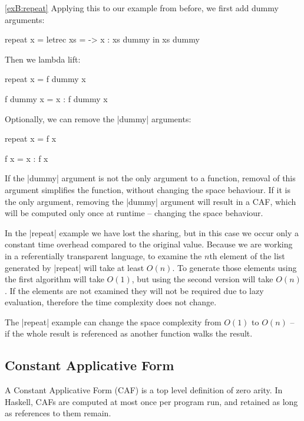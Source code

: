 \begin{examplerevisit}{\ref{exB:repeat}}
Applying this to our example from before, we first add dummy arguments:

\ignore\begin{code}
repeat x =  letrec xs = \dummy ->  x : xs dummy
            in xs dummy
\end{code}

Then we lambda lift:

\begin{onepage}
\begin{code}
repeat x = f dummy x

f dummy x = x : f dummy x
\end{code}
\end{onepage}

Optionally, we can remove the |dummy| arguments:

\begin{code}
repeat x = f x

f x = x : f x
\end{code}
\end{examplerevisit}

If the |dummy| argument is not the only argument to a function, removal of this argument simplifies the function, without changing the space behaviour. If it is the only argument, removing the |dummy| argument will result in a CAF, which will be computed only once at runtime -- changing the space behaviour.

In the |repeat| example we have lost the sharing, but in this case we occur only a constant time overhead compared to the original value. Because we are working in a referentially transparent language, to examine the $n$th element of the list generated by |repeat| will take at least $O(n)$. To generate those elements using the first algorithm will take $O(1)$, but using the second version will take $O(n)$. If the elements are not examined they will not be required due to lazy evaluation, therefore the time complexity does not change.

The |repeat| example can change the space complexity from $O(1)$ to $O(n)$ -- if the whole result is referenced as another function walks the result.

\subsection{Constant Applicative Form}

A Constant Applicative Form (CAF) is a top level definition of zero arity. In Haskell, CAFs are computed at most once per program run, and retained as long as references to them remain.

